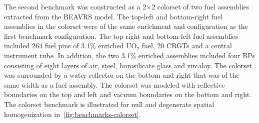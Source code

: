 The second benchmark was constructed as a 2$\times$2 colorset of two fuel assemblies extracted from the BEAVRS model. The top-left and bottom-right fuel assemblies in the colorset were of the same enrichment and configuration as the first benchmark configuration. The top-right and bottom-left fuel assemblies included 264 fuel pins of 3.1\% enriched UO$_2$ fuel, 20 CRGTs and a central instrument tube. In addition, the two 3.1\% enriched assemblies included four BPs consisting of eight layers of air, steel, borosilicate glass and zircaloy. The colorset was surrounded by a water reflector on the bottom and right that was of the same width as a fuel assembly. The colorset was modeled with reflective boundaries on the top and left and vacuum boundaries on the bottom and right. The colorset benchmark is illustrated for null and degenerate spatial homogenization in~\autoref{fig:benchmarks-colorset}.

